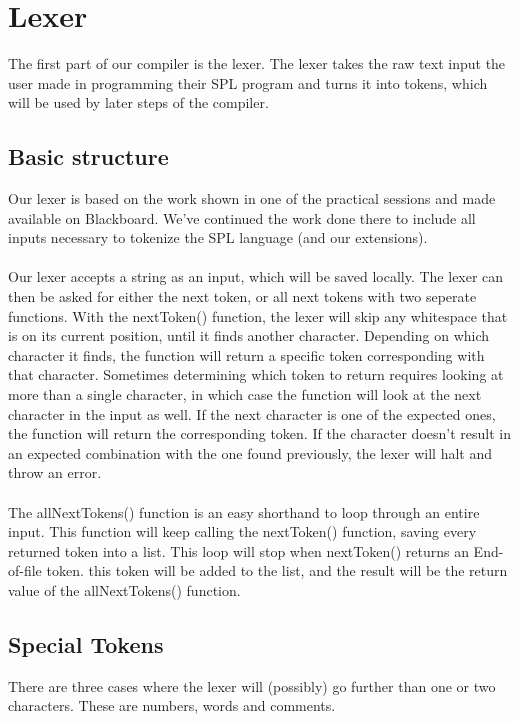 \documentclass[10pt,a4paper]{article}
\begin{document}
\section{Lexer}
The first part of our compiler is the lexer. The lexer takes the raw text input the user made in programming their SPL program and turns it into tokens, which will be used by later steps of the compiler.
\subsection{Basic structure}
Our lexer is based on the work shown in one of the practical sessions and made available on Blackboard. We've continued the work done there to include all inputs necessary to tokenize the SPL language (and our extensions). \\
\\
Our lexer accepts a string as an input, which will be saved locally. The lexer can then be asked for either the next token, or all next tokens with two seperate functions. With the nextToken() function, the lexer will skip any whitespace that is on its current position, until it finds another character. Depending on which character it finds, the function will return a specific token corresponding with that character. Sometimes determining which token to return requires looking at more than a single character, in which case the function will look at the next character in the input as well. If the next character is one of the expected ones, the function will return the corresponding token. If the character doesn't result in an expected combination with the one found previously, the lexer will halt and throw an error.\\
\\
The allNextTokens() function is an easy shorthand to loop through an entire input. This function will keep calling the nextToken() function, saving every returned token into a list. This loop will stop when nextToken() returns an End-of-file token. this token will be added to the list, and the result will be the return value of the allNextTokens() function.

\subsection{Special Tokens}
There are three cases where the lexer will (possibly) go further than one or two characters. These are numbers, words and comments.
\end{document}
